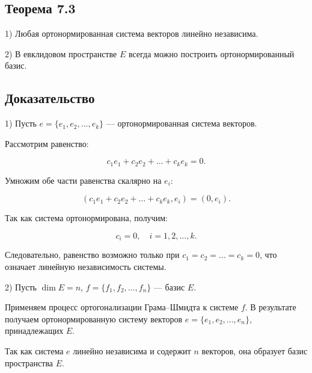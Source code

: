 {\subsection*{Теорема 7.3}

1) Любая ортонормированная система векторов линейно независима.

2) В евклидовом пространстве \( E \) всегда можно построить ортонормированный базис.

\subsection*{Доказательство}

1) Пусть \( e = \{e_1, e_2, \dots, e_k\} \) — ортонормированная система векторов.

Рассмотрим равенство:



\[
c_1 e_1 + c_2 e_2 + \dots + c_k e_k = 0.
\]



Умножим обе части равенства скалярно на \( e_i \):



\[
(c_1 e_1 + c_2 e_2 + \dots + c_k e_k, e_i) = (0, e_i).
\]



Так как система ортонормирована, получим:



\[
c_i = 0, \quad i = 1, 2, \dots, k.
\]



Следовательно, равенство возможно только при \( c_1 = c_2 = \dots = c_k = 0 \), что означает линейную независимость системы.

2) Пусть \( \dim E = n \), \( f = \{f_1, f_2, \dots, f_n\} \) — базис \( E \).

Применяем процесс ортогонализации Грама–Шмидта к системе \( f \). В результате получаем ортонормированную систему векторов \( e = \{e_1, e_2, \dots, e_n\} \), принадлежащих \( E \).

Так как система \( e \) линейно независима и содержит \( n \) векторов, она образует базис пространства \( E \).


}